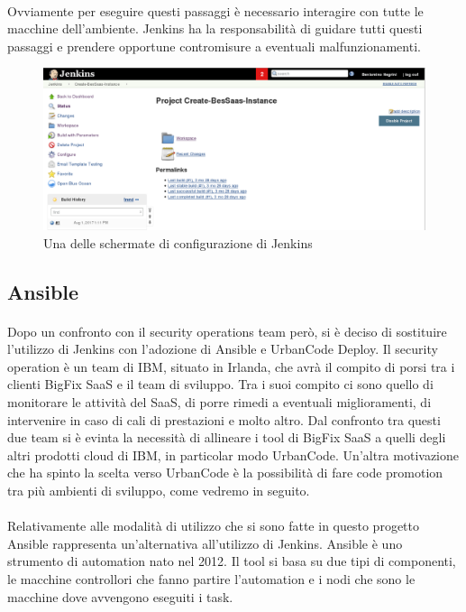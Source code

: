 \paragraph{}
Ovviamente per eseguire questi passaggi è necessario interagire con tutte le macchine dell'ambiente. Jenkins ha la responsabilità di guidare tutti questi passaggi e prendere opportune contromisure a eventuali malfunzionamenti. 
\begin{figure}[h]
	\centering
	\includegraphics[width=0.7\linewidth]{capitoli/imgs/jenkisProj}
	\caption{Una delle schermate di configurazione di Jenkins}
	\label{fig:jenkisproj}
\end{figure}

\subsection{Ansible}
\paragraph{}
Dopo un confronto con il security operations team però, si è deciso di sostituire l'utilizzo di Jenkins con l'adozione di Ansible e UrbanCode Deploy. Il security operation è un team di IBM, situato in Irlanda, che avrà il compito di porsi tra i clienti BigFix SaaS e il team di sviluppo. Tra i suoi compito ci sono quello di monitorare le attività del SaaS, di porre rimedi a eventuali miglioramenti, di intervenire in caso di cali di prestazioni e molto altro. Dal confronto tra questi due team si è evinta la necessità di allineare i tool di BigFix SaaS a quelli degli altri prodotti cloud di IBM, in particolar modo UrbanCode. Un'altra motivazione che ha spinto la scelta verso UrbanCode è la possibilità di fare code promotion tra più ambienti di sviluppo, come vedremo in seguito. 
\paragraph{}
Relativamente alle modalità di utilizzo che si sono fatte in questo progetto Ansible rappresenta un'alternativa all'utilizzo di Jenkins. Ansible è uno strumento di automation nato nel 2012. Il tool si basa su due tipi di componenti, le macchine controllori che fanno partire l'automation e i nodi che sono le macchine dove avvengono eseguiti i task. 
